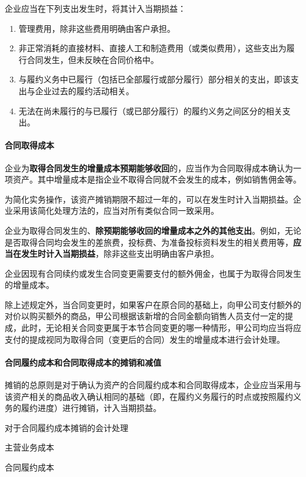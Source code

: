 \documentclass[UTF8,12pt]{ctexart}
\newenvironment{Dr}{%
	\begin{list}{}%
		{
			\setlength{\leftmargin}{2em}
			\setlength{\labelwidth}{2em}
			\setlength{\labelsep}{0pt}
			\setlength{\itemindent}{0pt}
			\setlength{\listparindent}{0pt}
			\setlength{\parsep}{0pt}
			\setlength{\topsep}{0pt}
		}
		\item[\textbf{借：}]
	}{%
	\end{list}
}
\newenvironment{Cr}{%
	\begin{list}{}%
		{
			\setlength{\leftmargin}{3em}
			\setlength{\labelwidth}{2em}
			\setlength{\labelsep}{0pt}
			\setlength{\itemindent}{0pt}
			\setlength{\listparindent}{0pt}
			\setlength{\parsep}{0pt}
			\setlength{\topsep}{0pt}
		}
		\item[\textbf{贷：}]
	}{%
	\end{list}
}
\numberwithin{equation}{section} %
\numberwithin{figure}{section}
\numberwithin{table}{section}
\begin{document}
	企业应当在下列支出发生时，将其计入当期损益：
	\begin{enumerate}
		\item 管理费用，除非这些费用明确由客户承担。
		
		\item 非正常消耗的直接材料、直接人工和制造费用（或类似费用），这些支出为履行合同发生，但未反映在合同价格中。
		
		\item 与履约义务中已履行（包括已全部履行或部分履行）部分相关的支出，即该支出与企业过去的履约活动相关。
		
		\item 无法在尚未履行的与已履行（或已部分履行）的履约义务之间区分的相关支出。
	\end{enumerate}
	
	\paragraph{合同取得成本}
	企业为\textbf{取得合同发生的增量成本预期能够收回}的，应当作为合同取得成本确认为一项资产。其中增量成本是指企业不取得合同就不会发生的成本，例如销售佣金等。
	
	为简化实务操作，该资产摊销期限不超过一年的，可以在发生时计入当期损益。企业采用该简化处理方法的，应当对所有类似合同一致采用。
	
	企业为取得合同发生的、\textbf{除预期能够收回的增量成本之外的其他支出}。例如，无论是否取得合同均会发生的差旅费，投标费、为准备投标资料发生的相关费用等，\textbf{应当在发生时计入当期损益}，除非这些支出明确由客户承担。
	
	企业因现有合同续约或发生合同变更需要支付的额外佣金，也属于为取得合同发生的增量成本。
	
	除上述规定外，当合同变更时，如果客户在原合同的基础上，向甲公司支付额外的对价以购买额外的商品，甲公司根据该新增的合同金额向销售人员支付一定的提成，此时，无论相关合同变更属于本节合同变更的哪一种情形，甲公司均应当将应支付的提成视同为取得合同（变更后的合同）发生的增量成本进行会计处理。
	
	\paragraph{合同履约成本和合同取得成本的摊销和减值}
	
	摊销的总原则是对于确认为资产的合同履约成本和合同取得成本，企业应当采用与该资产相关的商品收入确认相同的基础（即，在履约义务履行的时点或按照履约义务的履约进度）进行摊销，计入当期损益。
	
	对于合同履约成本摊销的会计处理
	\begin{Dr}
		主营业务成本
	\end{Dr}
	\begin{Cr}
		合同履约成本
	\end{Cr}
	
\end{document}
